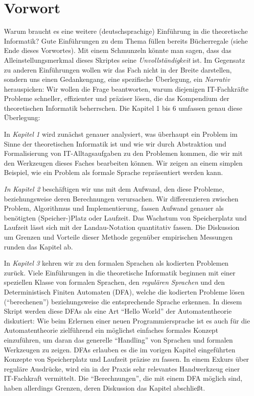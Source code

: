 \chapter{Vorwort}

Warum braucht es eine weitere (deutschsprachige) Einführung
in die theoretische Informatik?
Gute Einführungen zu dem Thema füllen bereits Bücherregale
(siehe Ende dieses Vorwortes).
Mit einem Schmunzeln könnte man sagen,
dass das Alleinstellungsmerkmal dieses Skriptes seine
\emph{Unvollständigkeit} ist.
Im Gegensatz zu anderen Einführungen wollen wir das Fach nicht in der Breite darstellen,
sondern uns einen Gedankengang, eine spezifische Überlegung,
ein \emph{Narrativ} herauspicken:
Wir wollen die Frage beantworten,
warum diejenigen IT-Fachkräfte Probleme
schneller, effizienter und präziser lösen,
die das Kompendium der theoretischen Informatik beherrschen.
Die Kapitel 1 bis 6 umfassen genau diese Überlegung:

In \emph{Kapitel 1} wird zunächst genauer analysiert,
was überhaupt ein Problem im Sinne der theoretischen Informatik ist
und wie wir durch Abstraktion und Formalisierung von IT-Alltagsaufgaben
zu den Problemen kommen, die wir mit den Werkzeugen dieses Faches bearbeiten können.
Wir zeigen an einem simplen Beispiel,
wie ein Problem als formale Sprache repräsentiert werden kann.

\emph{In Kapitel 2} beschäftigen wir uns mit dem Aufwand,
den diese Probleme, beziehungsweise deren Berechnungen verursachen.
Wir differenzieren zwischen Problem, Algorithmus und Implementierung,
fassen Aufwand genauer als benötigten (Speicher-)Platz oder Laufzeit.
Das Wachstum von Speicherplatz und Laufzeit lässt sich
mit der Landau-Notation quantitativ fassen.
Die Diskussion um Grenzen und Vorteile dieser Methode
gegenüber empirischen Messungen runden das Kapitel ab.

In \emph{Kapitel 3} kehren wir zu den formalen Sprachen als kodierten Problemen zurück.
Viele Einführungen in die theoretische Informatik beginnen
mit einer speziellen Klasse von formalen Sprachen,
den \emph{regulären Sprachen} und
den Deterministisch Finiten Automaten (DFA),
welche die kodierten Probleme lösen (``berechenen'')
beziehungsweise die entsprechende Sprache erkennen.
In diesem Skript werden diese DFAs
als eine Art ``Hello World'' der Automatentheorie diskutiert:
Wie beim Erlernen einer neuen Programmiersprache
ist es auch für die Automatentheorie zielführend
ein möglichst einfaches formales Konzept einzuführen,
um daran das generelle ``Handling'' von Sprachen und formalen Werkzeugen zu zeigen.
DFAs erlauben es die im vorigen Kapitel eingeführten
Konzepte von Speicherplatz und Laufzeit präzise zu fassen.
In einem Exkurs über reguläre Ausdrücke,
wird ein in der Praxis sehr relevantes Handwerkzeug einer IT-Fachkraft vermittelt.
Die ``Berechnungen'', die mit einem DFA möglich sind,
haben allerdings Grenzen, deren Diskussion das Kapitel abschließt.

